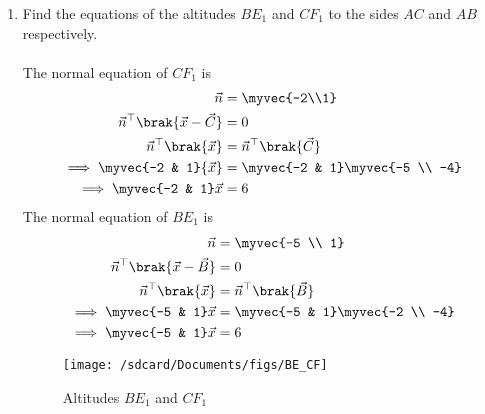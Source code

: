 \documentclass[11pt]{book}
\begin{document}
\begin{enumerate}[label=\thesection.\arabic*.,ref=\thesection.\theenumi]
	\item Find the equations of the altitudes $BE_1$ and $CF_1$ to the sides $AC$ and $AB$ respectively.\\
 \solution\\
The normal equation of $CF_1$ is 
\begin{align}
\vec{n} &= \myvec{-2\\1} \\
\vec{n}^{\top}\brak{\vec{x}-\vec{C}} &= 0 \\
\vec{n}^{\top}\brak{\vec{x}} &= \vec{n}^{\top}\brak {\vec{C}} \\
\implies \myvec{-2 & 1}{\vec{x}} &= \myvec{-2 & 1} \myvec{-5 \\ -4}  \\
	\implies \myvec{-2 & 1}\vec{x} &= 6
\end{align}
The normal equation of $BE_1$ is 
\begin{align}
\vec{n} &= \myvec{-5 \\ 1}\\
\vec{n}^{\top}\brak{\vec{x}-\vec{B}} &= 0 \\
\vec{n}^{\top}\brak{\vec{x}} &= \vec{n}^{\top}\brak {\vec{B}}\\
	\implies \myvec{-5 & 1}\vec{x} &= \myvec{-5 & 1} \myvec{-2 \\ -4}\\
	\implies \myvec{-5 & 1}\vec{x} &= 6
\end{align}
\begin{figure}[H]
\texttt{[image: /sdcard/Documents/figs/BE\_CF]}
\caption{Altitudes $BE_1$ and $CF_1$ }
\label{fig:Line BE and CF}
\end{figure}


\end{enumerate}
\end{document}
